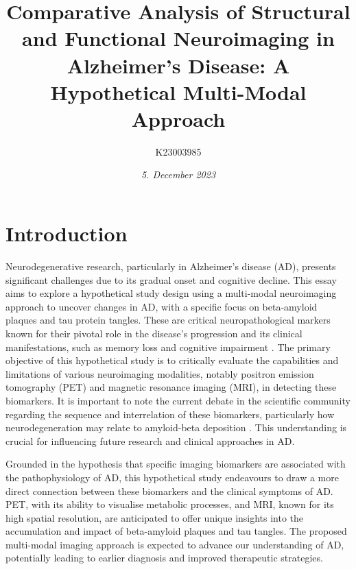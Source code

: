 \documentclass[10pt]{article}
\title{\textbf{Comparative Analysis of Structural and Functional Neuroimaging in Alzheimer’s Disease: }A Hypothetical Multi-Modal Approach}
\author[ ]{K23003985}
\date{\textit{5. December 2023}}
\begin{document}

\maketitle

\doublespacing

\begin{sloppypar} %





  \section{Introduction}
  \label{sec:introduction}

  Neurodegenerative research, particularly in Alzheimer’s disease (AD), presents significant challenges due to its gradual onset and cognitive decline. This essay aims to explore a hypothetical study design using a multi-modal neuroimaging approach to uncover changes in AD, with a specific focus on beta-amyloid plaques and tau protein tangles. These are critical neuropathological markers known for their pivotal role in the disease’s progression and its clinical manifestations, such as memory loss and cognitive impairment \citep{heneka_neuroinflammation_2015,marttinen_molecular_2018}. The primary objective of this hypothetical study is to critically evaluate the capabilities and limitations of various neuroimaging modalities, notably positron emission tomography (PET) and magnetic resonance imaging (MRI), in detecting these biomarkers. It is important to note the current debate in the scientific community regarding the sequence and interrelation of these biomarkers, particularly how neurodegeneration may relate to amyloid-beta deposition \citep{besson_cognitive_2015}. This understanding is crucial for influencing future research and clinical approaches in AD.

  Grounded in the hypothesis that specific imaging biomarkers are associated with the pathophysiology of AD, this hypothetical study endeavours to draw a more direct connection between these biomarkers and the clinical symptoms of AD. PET, with its ability to visualise metabolic processes, and MRI, known for its high spatial resolution, are anticipated to offer unique insights into the accumulation and impact of beta-amyloid plaques and tau tangles. The proposed multi-modal imaging approach is expected to advance our understanding of AD, potentially leading to earlier diagnosis and improved therapeutic strategies.


\end{sloppypar}
\end{document}
